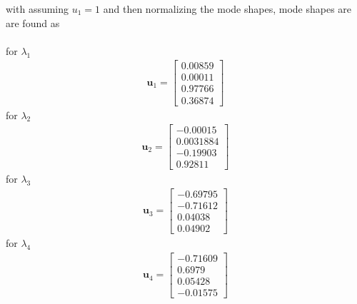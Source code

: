 \documentclass[]{report}
\begin{document}
with assuming $u_1=1$ and then normalizing the mode shapes, mode shapes are are found as\\~\\
for $\lambda_1$
\begin{eqnarray*}
\mathbf{u}_1=\left[\begin{array}{cccc} 0.00859  \\ 0.00011  \\ 0.97766  \\ 0.36874 \end{array}\right]
\end{eqnarray*}
for $\lambda_2$
\begin{eqnarray*}
\mathbf{u}_2=\left[\begin{array}{cccc} -0.00015  \\ 0.0031884  \\ -0.19903  \\ 0.92811 \end{array}\right]
\end{eqnarray*}
for $\lambda_3$
\begin{eqnarray*}
\mathbf{u}_3=\left[\begin{array}{cccc} -0.69795  \\ -0.71612 \\ 0.04038  \\ 0.04902\end{array}\right]
\end{eqnarray*}
for $\lambda_4$
\begin{eqnarray*}
\mathbf{u}_4=\left[\begin{array}{cccc} -0.71609 \\ 0.6979  \\ 0.05428  \\ -0.01575 \end{array}\right]
\end{eqnarray*}
\end{document}

